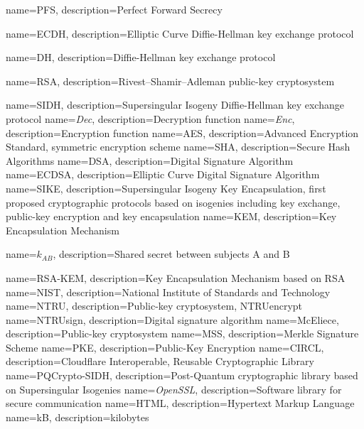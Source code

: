 
{
    name=PFS,
    description={Perfect Forward Secrecy}
}

{
    name=ECDH,
    description={Elliptic Curve Diffie-Hellman key exchange protocol}
}

{
    name=DH,
    description={Diffie-Hellman key exchange protocol}
}

{
    name=RSA,
    description={Rivest–Shamir–Adleman public-key cryptosystem}
}

{
    name=SIDH,
    description={Supersingular Isogeny Diffie-Hellman key exchange protocol}
}
{
    name=\textit{Dec},
    description={Decryption function}
}
{
    name=\textit{Enc},
    description={Encryption function}
}
{
    name=AES,
    description={Advanced Encryption Standard, symmetric encryption scheme}
}
{
    name=SHA,
    description={Secure Hash Algorithms}
}
{
    name=DSA,
    description={Digital Signature Algorithm}
}
{
    name=ECDSA,
    description={Elliptic Curve Digital Signature Algorithm}
}
{
    name=SIKE,
    description={Supersingular Isogeny Key Encapsulation, first proposed cryptographic protocols based on isogenies including key exchange, public-key encryption and key encapsulation}
}
{
    name=KEM,
    description={Key Encapsulation Mechanism}
}

{
    name=$k_{AB}$,
    description={Shared secret between subjects A and B}
}

{
    name=RSA-KEM,
    description={Key Encapsulation Mechanism based on RSA}
}
{
    name=NIST,
    description={National Institute of Standards and Technology}
}
{
    name=NTRU,
    description={Public-key cryptosystem, NTRUencrypt}
}
{
    name=NTRUsign,
    description={Digital signature algorithm}
}
{
    name=McEliece,
    description={Public-key cryptosystem}
}
{
    name=MSS,
    description={Merkle Signature Scheme}
}
{
    name=PKE,
    description={Public-Key Encryption}
}
{
    name=CIRCL,
    description={Cloudflare Interoperable, Reusable Cryptographic Library}
}
{
    name=PQCrypto-SIDH,
    description={Post-Quantum cryptographic library based on Supersingular Isogenies}
}
{
    name=\textit{OpenSSL},
    description={Software library for secure communication}
}
{
    name=HTML,
    description={Hypertext Markup Language}
}
{
    name=kB,
    description={kilobytes}
}

